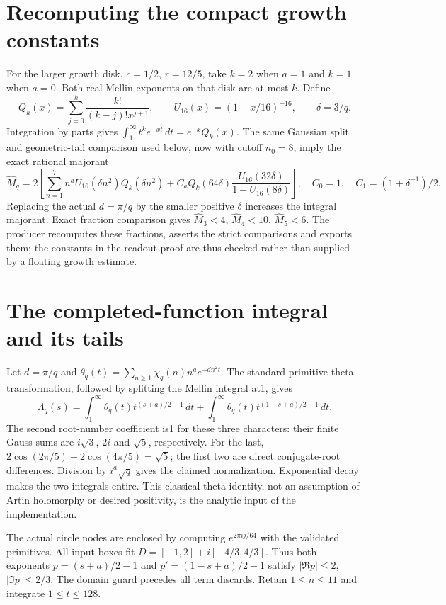 \section{Recomputing the compact growth constants}
For the larger growth disk, $c=1/2$, $r=12/5$, take $k=2$ when $a=1$
and $k=1$ when $a=0$. Both real Mellin exponents on that disk are at most
$k$. Define
\[
 Q_k(x)=\sum_{j=0}^k\frac{k!}{(k-j)!x^{j+1}},\qquad
 U_{16}(x)=(1+x/16)^{-16},\qquad \delta=3/q.
\]
Integration by parts gives
$\int_1^\infty t^ke^{-xt}\,dt=e^{-x}Q_k(x)$.
The same Gaussian split and geometric-tail comparison used below, now
with cutoff $n_0=8$, imply the exact rational majorant
\[
 \widehat M_q=2\left[
 \sum_{n=1}^{7}n^aU_{16}(\delta n^2)Q_k(\delta n^2)
 +C_aQ_k(64\delta)\frac{U_{16}(32\delta)}{1-U_{16}(8\delta)}\right],
 \quad C_0=1,\quad C_1=(1+\delta^{-1})/2.
\]
Replacing the actual $d=\pi/q$ by the smaller positive $\delta$ increases
the integral majorant. Exact fraction comparison gives
$\widehat M_3<4$, $\widehat M_4<10$, $\widehat M_5<6$.
The producer recomputes these fractions, asserts the strict comparisons and
exports them; the constants in the readout proof are thus checked rather
than supplied by a floating growth estimate.

\section{The completed-function integral and its tails}
Let $d=\pi/q$ and $\theta_q(t)=\sum_{n\ge1}\chi_q(n)n^ae^{-dn^2t}$.
The standard primitive theta transformation, followed by splitting the Mellin
integral at1, gives
\[
 \Lambda_q(s)=\int_1^\infty\theta_q(t)t^{(s+a)/2-1}\,dt+
              \int_1^\infty\theta_q(t)t^{(1-s+a)/2-1}\,dt.
\]
The second root-number coefficient is1 for these three characters: their
finite Gauss sums are $i\sqrt3$, $2i$ and $\sqrt5$, respectively.
For the last, $2\cos(2\pi/5)-2\cos(4\pi/5)=\sqrt5$; the first two are direct
conjugate-root differences. Division by $i^a\sqrt q$ gives the claimed
normalization. Exponential decay makes the two integrals entire. This classical
theta identity, not an assumption of Artin holomorphy or desired positivity,
is the analytic input of the implementation.

The actual circle nodes are enclosed by computing $e^{2\pi i j/64}$ with
the validated primitives. All input boxes fit
$D=[-1,2]+i[-4/3,4/3]$. Thus both exponents
$p=(s+a)/2-1$ and $p'=(1-s+a)/2-1$ satisfy
$|\Re p|\le2$, $|\Im p|\le2/3$. The domain guard precedes all term discards.
Retain $1\le n\le11$ and integrate $1\le t\le128$.

